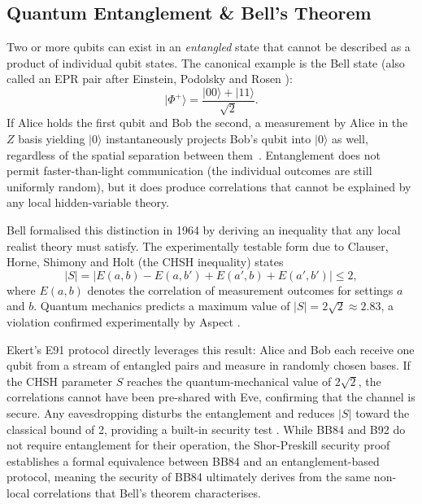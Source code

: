 \documentclass[10pt, a4paper]{report}
\newcommand{\ket}[1]{\ensuremath{|#1\rangle}}
\begin{document}
\subsection{Quantum Entanglement \& Bell's Theorem}

Two or more qubits can exist in an \textit{entangled} state that cannot be described as a product of individual qubit states. The canonical example is the Bell state (also called an EPR pair after Einstein, Podolsky and Rosen \cite{EPR1935}): %
%
\begin{equation}
\label{eq:bell-state}
\ket{\Phi^{+}} = \frac{\ket{00}+\ket{11}}{\sqrt{2}}.
\end{equation}
%
If Alice holds the first qubit and Bob the second, a measurement by Alice in the $Z$ basis yielding $\ket{0}$ instantaneously projects Bob's qubit into $\ket{0}$ as well, regardless of the spatial separation between them~\cite{QKDbible}. Entanglement does not permit faster-than-light communication (the individual outcomes are still uniformly random), but it does produce correlations that cannot be explained by any local hidden-variable theory.

Bell \cite{Bell1964} formalised this distinction in 1964 by deriving an inequality that any local realist theory must satisfy. The experimentally testable form due to Clauser, Horne, Shimony and Holt \cite{CHSH1969} (the CHSH inequality) states
%
\begin{equation}
\label{eq:chsh}
|S| = |E(a,b) - E(a,b') + E(a',b) + E(a',b')| \leq 2,
\end{equation}
%
where $E(a,b)$ denotes the correlation of measurement outcomes for settings $a$ and $b$. Quantum mechanics predicts a maximum value of $|S| = 2\sqrt{2} \approx 2.83$, a violation confirmed experimentally by Aspect \cite{Aspect1982}.

Ekert's E91 protocol \cite{E91} directly leverages this result: Alice and Bob each receive one qubit from a stream of entangled pairs and measure in randomly chosen bases. If the CHSH parameter $S$ reaches the quantum-mechanical value of $2\sqrt{2}$, the correlations cannot have been pre-shared with Eve, confirming that the channel is secure. Any eavesdropping disturbs the entanglement and reduces $|S|$ toward the classical bound of 2, providing a built-in security test \cite{ekertQI}. While BB84 and B92 do not require entanglement for their operation, the Shor-Preskill security proof \cite{ShorPreskill2000} establishes a formal equivalence between BB84 and an entanglement-based protocol, meaning the security of BB84 ultimately derives from the same non-local correlations that Bell's theorem characterises.
\end{document}
